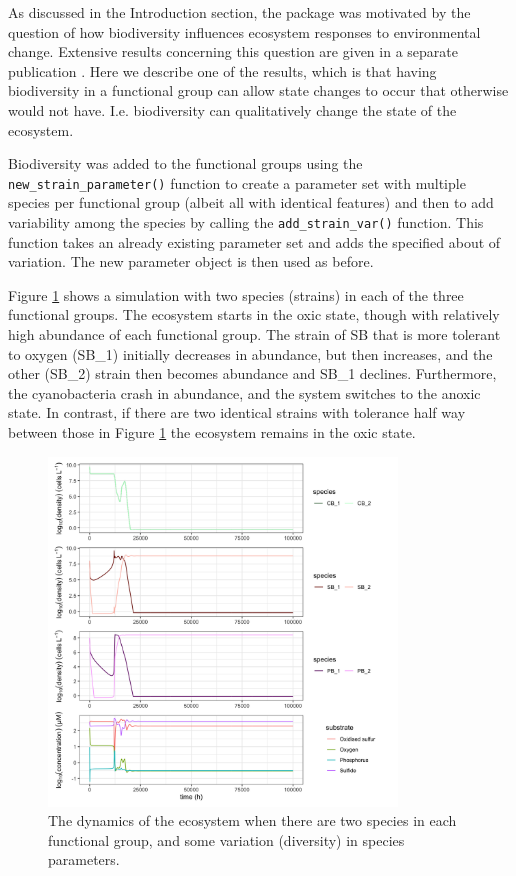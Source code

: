 \documentclass[]{elsarticle} %
\begin{document}
As discussed in the Introduction section, the package was motivated by
the question of how biodiversity influences ecosystem responses to
environmental change. Extensive results concerning this question are
given in a separate publication \citet{Limberger2022}. Here we describe
one of the results, which is that having biodiversity in a functional
group can allow state changes to occur that otherwise would not have.
I.e. biodiversity can qualitatively change the state of the ecosystem.

Biodiversity was added to the functional groups using the
\texttt{new\_strain\_parameter()} function to create a parameter set
with multiple species per functional group (albeit all with identical
features) and then to add variability among the species by calling the
\texttt{add\_strain\_var()} function. This function takes an already
existing parameter set and adds the specified about of variation. The
new parameter object is then used as before.

Figure \ref{fig:uc3} shows a simulation with two species (strains) in
each of the three functional groups. The ecosystem starts in the oxic
state, though with relatively high abundance of each functional group.
The strain of SB that is more tolerant to oxygen (SB\_1) initially
decreases in abundance, but then increases, and the other (SB\_2) strain
then becomes abundance and SB\_1 declines. Furthermore, the
cyanobacteria crash in abundance, and the system switches to the anoxic
state. In contrast, if there are two identical strains with tolerance
half way between those in Figure \ref{fig:uc3} the ecosystem remains in
the oxic state.

\begin{figure}

{\centering \includegraphics[width=350px]{figures/uc3_supplement_5_4} 

}

\caption{The dynamics of the ecosystem when there are two species in each functional group, and some variation (diversity) in species parameters.}\label{fig:uc3}
\end{figure}
\end{document}
